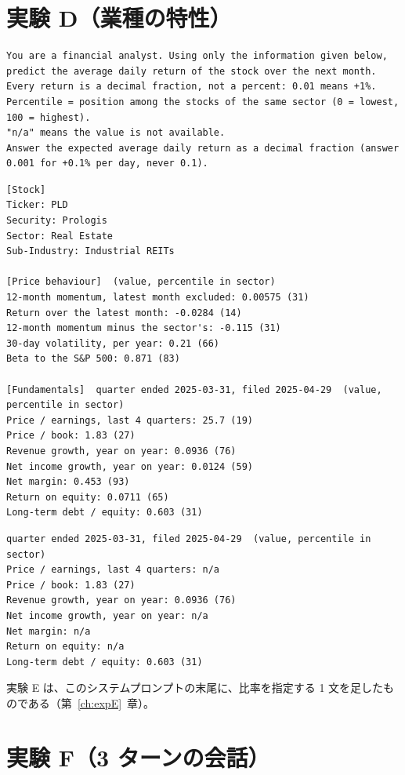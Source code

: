\documentclass[xelatex,ja=standard,jafont=hiragino-pron,a4paper,10pt]{bxjsreport}
\newcommand{\chapref}[1]{第~\ref{#1}~章}
\begin{document}
\section{実験 D（業種の特性）}

\begin{lstlisting}[caption={実験 D のシステムプロンプト}]
You are a financial analyst. Using only the information given below, predict the average daily return of the stock over the next month.
Every return is a decimal fraction, not a percent: 0.01 means +1%.
Percentile = position among the stocks of the same sector (0 = lowest, 100 = highest).
"n/a" means the value is not available.
Answer the expected average daily return as a decimal fraction (answer 0.001 for +0.1% per day, never 0.1).
\end{lstlisting}
\begin{lstlisting}[caption={実験 D のユーザープロンプト（指標を渡す条件。PLD、判断日 2025-06-30）},label={lst:expD}]
[Stock]
Ticker: PLD
Security: Prologis
Sector: Real Estate
Sub-Industry: Industrial REITs

[Price behaviour]  (value, percentile in sector)
12-month momentum, latest month excluded: 0.00575 (31)
Return over the latest month: -0.0284 (14)
12-month momentum minus the sector's: -0.115 (31)
30-day volatility, per year: 0.21 (66)
Beta to the S&P 500: 0.871 (83)

[Fundamentals]  quarter ended 2025-03-31, filed 2025-04-29  (value, percentile in sector)
Price / earnings, last 4 quarters: 25.7 (19)
Price / book: 1.83 (27)
Revenue growth, year on year: 0.0936 (76)
Net income growth, year on year: 0.0124 (59)
Net margin: 0.453 (93)
Return on equity: 0.0711 (65)
Long-term debt / equity: 0.603 (31)
\end{lstlisting}
\begin{lstlisting}[caption={同じ銘柄で、問題の指標を n/a にした条件（Fundamentals の部分）}]
quarter ended 2025-03-31, filed 2025-04-29  (value, percentile in sector)
Price / earnings, last 4 quarters: n/a
Price / book: 1.83 (27)
Revenue growth, year on year: 0.0936 (76)
Net income growth, year on year: n/a
Net margin: n/a
Return on equity: n/a
Long-term debt / equity: 0.603 (31)
\end{lstlisting}

実験 E は、このシステムプロンプトの末尾に、比率を指定する 1 文を足したものである（\chapref{ch:expE}）。

\section{実験 F（3 ターンの会話）}
\end{document}
